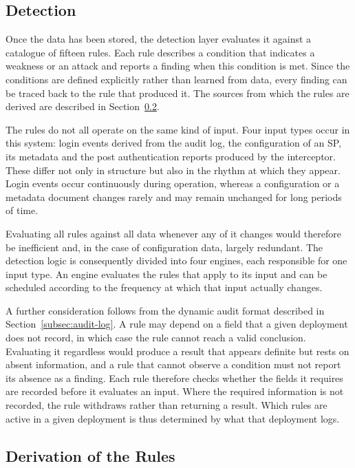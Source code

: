 \documentclass[../main.tex]{subfiles}
\begin{document}
\subsection{Detection}\label{subsec:detection}

Once the data has been stored, the detection layer evaluates it against a catalogue of fifteen rules. 
Each rule describes a condition that indicates a weakness or an attack and reports a finding when 
this condition is met. 
Since the conditions are defined explicitly rather than learned from data, every finding can be 
traced back to the rule that produced it. 
The sources from which the rules are derived are described in Section~\ref{subsec:rules-derivation}.

The rules do not all operate on the same kind of input. 
Four input types occur in this system: login events derived from the audit log, the configuration 
of an SP, its metadata and the post authentication reports produced by the interceptor.
These differ not only in structure but also in the rhythm at which they appear. 
Login events occur continuously during operation, whereas a configuration or a metadata document 
changes rarely and may remain unchanged for long periods of time.

Evaluating all rules against all data whenever any of it changes would therefore be inefficient 
and, in the case of configuration data, largely redundant. 
The detection logic is consequently divided into four engines, each responsible for one input type. 
An engine evaluates the rules that apply to its input and can be scheduled according to the 
frequency at which that input actually changes.

A further consideration follows from the dynamic audit format described in 
Section~\ref{subsec:audit-log}. 
A rule may depend on a field that a given deployment does not record, in which case the rule 
cannot reach a valid conclusion. 
Evaluating it regardless would produce a result that appears definite but rests on absent 
information, and a rule that cannot observe a condition must not report its absence as a finding. 
Each rule therefore checks whether the fields it requires are recorded before it evaluates an input. 
Where the required information is not recorded, the rule withdraws rather than returning a result. 
Which rules are active in a given deployment is thus determined by what that deployment logs. 

\subsection{Derivation of the Rules}\label{subsec:rules-derivation}
\end{document}
